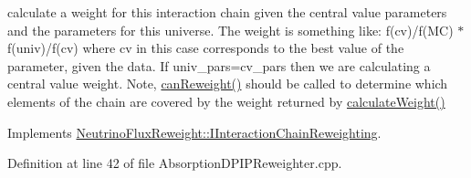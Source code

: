 calculate a weight for this interaction chain given the central value parameters and the parameters for this universe. The weight is something like\-: f(cv)/f(M\-C) $\ast$ f(univ)/f(cv) where cv in this case corresponds to the best value of the parameter, given the data. If univ\-\_\-pars=cv\-\_\-pars then we are calculating a central value weight. Note, \hyperlink{class_neutrino_flux_reweight_1_1_absorption_d_p_i_p_reweighter_a9fc3f50ccda671f623473e43ba49989f}{can\-Reweight()} should be called to determine which elements of the chain are covered by the weight returned by \hyperlink{class_neutrino_flux_reweight_1_1_absorption_d_p_i_p_reweighter_a8b1fcaecb31a3612ec2f5e2a0026bcb6}{calculate\-Weight()} 



Implements \hyperlink{class_neutrino_flux_reweight_1_1_i_interaction_chain_reweighting_ae28403553637013fdc720674ee24c7c5}{Neutrino\-Flux\-Reweight\-::\-I\-Interaction\-Chain\-Reweighting}.



Definition at line 42 of file Absorption\-D\-P\-I\-P\-Reweighter.\-cpp.


